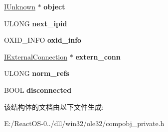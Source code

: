 \begin{DoxyCompactItemize}
\hyperlink{interface_i_unknown}{I\+Unknown} $\ast$ {\bfseries object}
\item 
\mbox{\label{structstub__manager_a13b16837fdc10f7dbeede922aa02d162}} 
U\+L\+O\+NG {\bfseries next\+\_\+ipid}
\item 
\mbox{\label{structstub__manager_a3c43cdc98eb5b18c8428c29b5a12c710}} 
O\+X\+I\+D\+\_\+\+I\+N\+FO {\bfseries oxid\+\_\+info}
\item 
\mbox{\label{structstub__manager_a3fd1304240681e214549594b4ca53bbb}} 
\hyperlink{interface_i_external_connection}{I\+External\+Connection} $\ast$ {\bfseries extern\+\_\+conn}
\item 
\mbox{\label{structstub__manager_a05114b288f01c8a348ac091ea17c851b}} 
U\+L\+O\+NG {\bfseries norm\+\_\+refs}
\item 
\mbox{\label{structstub__manager_abbb856f8154ad5fc7669e036c9d33695}} 
B\+O\+OL {\bfseries disconnected}
\end{DoxyCompactItemize}


该结构体的文档由以下文件生成\+:\begin{DoxyCompactItemize}
\item 
E\+:/\+React\+O\+S-\/0../dll/win32/ole32/compobj\+\_\+private.\+h\end{DoxyCompactItemize}
